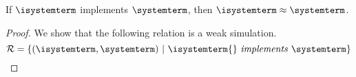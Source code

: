 \begin{theorem} If  $\isystemterm$ implements $\systemterm$, then $\isystemterm\approx\systemterm$. 
\end{theorem}



\begin{proof} We show that the following relation is a weak simulation.
\[
\mathcal{R} = \{ (\isystemterm, \systemterm) \ |\ \implements{\isystemterm{}}{\systemterm} \}
\]






\end{proof}
